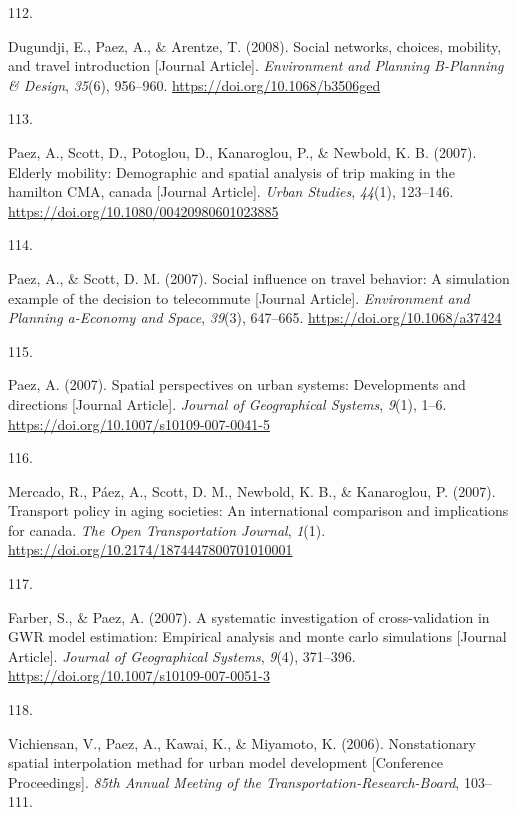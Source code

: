 \documentclass[11pt,a4paper,]{awesome-cv}
\newlength{\csllabelwidth}
\newcommand{\CSLLeftMargin}[1]{\parbox[t]{\csllabelwidth}{#1}}
\newcommand{\CSLRightInline}[1]{\parbox[t]{\linewidth - \csllabelwidth}{#1}}
\begin{document}
\leavevmode{}%
\CSLLeftMargin{112. }
\CSLRightInline{Dugundji, E., Paez, A., \& Arentze, T. (2008). Social
networks, choices, mobility, and travel introduction {[}Journal
Article{]}. \emph{Environment and Planning B-Planning \& Design},
\emph{35}(6), 956--960. \url{https://doi.org/10.1068/b3506ged}}

\leavevmode{}%
\CSLLeftMargin{113. }
\CSLRightInline{Paez, A., Scott, D., Potoglou, D., Kanaroglou, P., \&
Newbold, K. B. (2007). Elderly mobility: Demographic and spatial
analysis of trip making in the hamilton CMA, canada {[}Journal
Article{]}. \emph{Urban Studies}, \emph{44}(1), 123--146.
\url{https://doi.org/10.1080/00420980601023885}}

\leavevmode{}%
\CSLLeftMargin{114. }
\CSLRightInline{Paez, A., \& Scott, D. M. (2007). Social influence on
travel behavior: A simulation example of the decision to telecommute
{[}Journal Article{]}. \emph{Environment and Planning a-Economy and
Space}, \emph{39}(3), 647--665. \url{https://doi.org/10.1068/a37424}}

\leavevmode{}%
\CSLLeftMargin{115. }
\CSLRightInline{Paez, A. (2007). Spatial perspectives on urban systems:
Developments and directions {[}Journal Article{]}. \emph{Journal of
Geographical Systems}, \emph{9}(1), 1--6.
\url{https://doi.org/10.1007/s10109-007-0041-5}}

\leavevmode{}%
\CSLLeftMargin{116. }
\CSLRightInline{Mercado, R., Páez, A., Scott, D. M., Newbold, K. B., \&
Kanaroglou, P. (2007). Transport policy in aging societies: An
international comparison and implications for canada. \emph{The Open
Transportation Journal}, \emph{1}(1).
\url{https://doi.org/10.2174/1874447800701010001}}

\leavevmode{}%
\CSLLeftMargin{117. }
\CSLRightInline{Farber, S., \& Paez, A. (2007). A systematic
investigation of cross-validation in GWR model estimation: Empirical
analysis and monte carlo simulations {[}Journal Article{]}.
\emph{Journal of Geographical Systems}, \emph{9}(4), 371--396.
\url{https://doi.org/10.1007/s10109-007-0051-3}}

\leavevmode{}%
\CSLLeftMargin{118. }
\CSLRightInline{Vichiensan, V., Paez, A., Kawai, K., \& Miyamoto, K.
(2006). Nonstationary spatial interpolation methad for urban model
development {[}Conference Proceedings{]}. \emph{85th Annual Meeting of
the Transportation-Research-Board}, 103--111.}
\end{document}
